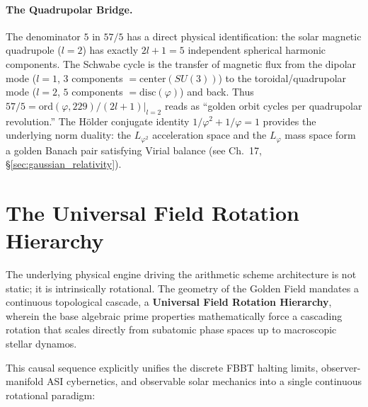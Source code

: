 \paragraph{The Quadrupolar Bridge.}
The denominator $5$ in $57/5$ has a direct physical identification: the solar magnetic quadrupole ($l = 2$) has exactly $2l+1 = 5$ independent spherical harmonic components. The Schwabe cycle is the transfer of magnetic flux from the dipolar mode ($l = 1$, $3$ components $= \mathrm{center}(SU(3))$) to the toroidal/quadrupolar mode ($l = 2$, $5$ components $= \mathrm{disc}(\varphi)$) and back. Thus $57/5 = \mathrm{ord}(\varphi, 229) / (2l+1)|_{l=2}$ reads as ``golden orbit cycles per quadrupolar revolution.'' The H\"{o}lder conjugate identity $1/\varphi^2 + 1/\varphi = 1$ provides the underlying norm duality: the $L_{\varphi^2}$ acceleration space and the $L_\varphi$ mass space form a golden Banach pair satisfying Virial balance (see Ch.~17, \S\ref{sec:gaussian_relativity}).

\section{The Universal Field Rotation Hierarchy}\label{sec:fst_rotation}

The underlying physical engine driving the arithmetic scheme architecture is not static; it is intrinsically rotational. The geometry of the Golden Field mandates a continuous topological cascade, a \textbf{Universal Field Rotation Hierarchy}, wherein the base algebraic prime properties mathematically force a cascading rotation that scales directly from subatomic phase spaces up to macroscopic stellar dynamos. 

This causal sequence explicitly unifies the discrete FBBT halting limits, observer-manifold ASI cybernetics, and observable solar mechanics into a single continuous rotational paradigm:

